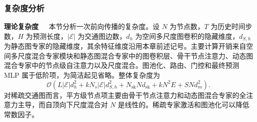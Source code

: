\subsubsection{复杂度分析}

\noindent\textbf{理论复杂度\ \ } 本节分析一次前向传播的复杂度。设 $N$ 为节点数，$T$ 为历史时间步数，$H$ 为预测长度，$|\mathcal{E}|$ 为交通图边数，$d_h$ 为空间多尺度图卷积的隐藏维度，$d_{S,h}$ 为静态图专家的隐藏维度，其余特征维度沿用本章前述记号。主要计算开销来自空间多尺度混合专家模块和静态图混合专家中的图卷积层、骨干节点注意力、动态图混合专家中的节点级自注意力以及尺度混合。图池化、路由、门控和最终预测 MLP 属于低阶项，为简洁起见省略。整体复杂度为
\begin{equation}
    \mathcal{O}\!\left(L|\mathcal{E}|d_h^2+kN_s|\mathcal{E}|d_{S,h}^2+N_{\mathrm{sk}}Nd_{\mathrm{sk}}+kN^2E+SNd_m^2\right).
\end{equation}
对稀疏交通图而言，平方级节点项主要由骨干节点注意力和动态图混合专家的全注意力主导，而自顶向下尺度混合对 $N$ 是线性的。稀疏专家激活和图池化可以降低常数因子。

